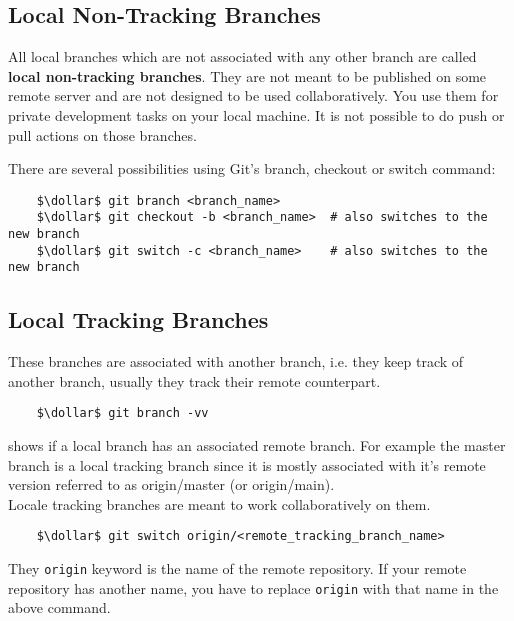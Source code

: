 \subsection*{Local Non-Tracking Branches}

All local branches which are not associated with any other branch are called \textbf{local non-tracking branches}. They are not meant to 
be published on some remote server and are not designed to be used collaboratively. You use them for private 
development tasks on your local machine. It is not possible to do push or pull actions on those branches.


There are several possibilities using Git's branch, checkout or switch command:
\begin{lstlisting}
	$\dollar$ git branch <branch_name>
	$\dollar$ git checkout -b <branch_name>  # also switches to the new branch
	$\dollar$ git switch -c <branch_name>    # also switches to the new branch 
\end{lstlisting}



\subsection*{Local Tracking Branches}

These branches are associated with another branch, i.e. they keep track of another branch, usually they track 
their remote counterpart. 
\begin{lstlisting}
	$\dollar$ git branch -vv
\end{lstlisting}
shows if a local branch has an associated remote branch. For example the master branch is a local tracking  
branch since it is mostly associated with it's remote version referred to as origin/master (or origin/main).
\\
Locale tracking branches are meant to work collaboratively on them. 


\begin{lstlisting}
	$\dollar$ git switch origin/<remote_tracking_branch_name>
\end{lstlisting}

They \verb|origin| keyword is the name of the remote repository. If your remote repository has another name, you have to replace
\verb|origin| with that name in the above command.  

